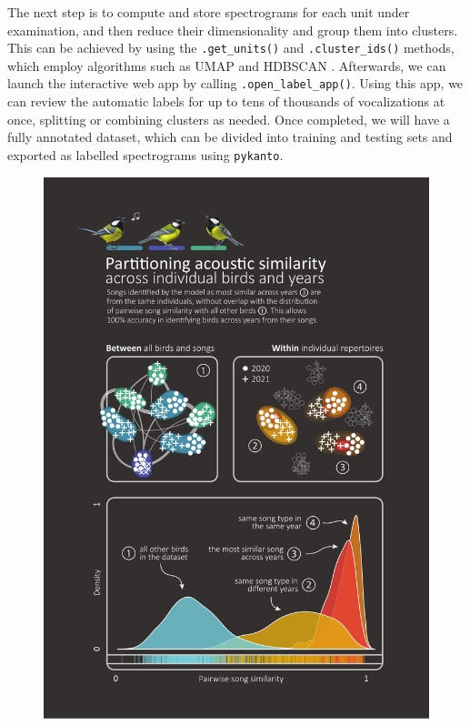 The next step is to compute and store spectrograms for each unit under
examination, and then reduce their dimensionality and group them into clusters.
This can be achieved by using the \texttt{.get\_units()} and \texttt{.cluster\_ids()} methods, which
employ algorithms such as UMAP \parencite{mcinnes2018} and HDBSCAN
\parencite{mcinnes2017}. Afterwards, we can launch the interactive web app by
calling \texttt{.open\_label\_app()}. Using this app, we can review the automatic labels
for up to tens of thousands of vocalizations at once, splitting or combining
clusters as needed. Once completed, we will have a fully annotated dataset, which
can be divided into training and testing sets and exported as labelled
spectrograms using \texttt{pykanto}. 



\begin{figure}
    \centering
    \includegraphics[width=\linewidth]{figures/chapter_2/fig3.pdf}
    \label{c2_fig:results}
\end{figure}
